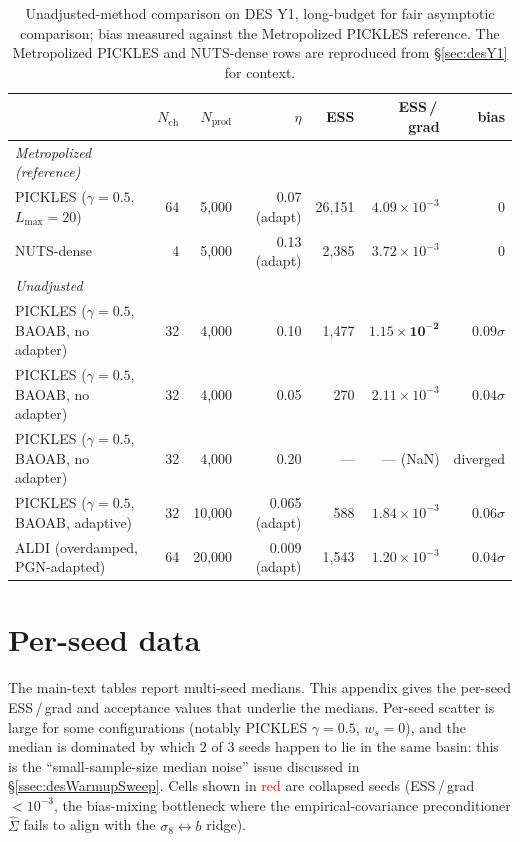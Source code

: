\documentclass{article}
\begin{document}
\begin{table}[t]
\centering
\caption{Unadjusted-method comparison on DES Y1, long-budget for fair
asymptotic comparison; bias measured against the Metropolized PICKLES
reference. The Metropolized PICKLES and NUTS-dense rows are reproduced
from \S\ref{sec:desY1} for context.}
\label{tab:desUnadjLongN}
\small
\begin{tabular}{l rrrr rr}
\toprule
& $N_{\text{ch}}$ & $N_{\text{prod}}$ & $\eta$ & ESS &
ESS\,/\,grad & bias \\
\midrule
\textit{Metropolized (reference)} & & & & & & \\
\quad PICKLES ($\gamma=0.5$, $L_{\max}=20$) & 64 & 5{,}000 & 0.07 (adapt) & 26{,}151 & $4.09\!\times\!10^{-3}$ & 0 \\
\quad NUTS-dense                              & 4  & 5{,}000 & 0.13 (adapt) & 2{,}385  & $3.72\!\times\!10^{-3}$ & 0 \\
\midrule
\textit{Unadjusted} & & & & & & \\
\quad PICKLES ($\gamma=0.5$, BAOAB, no adapter) & 32 & 4{,}000 & 0.10  & 1{,}477 & $\mathbf{1.15\!\times\!10^{-2}}$ & $0.09\sigma$ \\
\quad PICKLES ($\gamma=0.5$, BAOAB, no adapter) & 32 & 4{,}000 & 0.05  &     270 & $2.11\!\times\!10^{-3}$ & $0.04\sigma$ \\
\quad PICKLES ($\gamma=0.5$, BAOAB, no adapter) & 32 & 4{,}000 & 0.20  & --- & --- (NaN) & diverged \\
\quad PICKLES ($\gamma=0.5$, BAOAB, adaptive)   & 32 & 10{,}000 & 0.065 (adapt) &  588 & $1.84\!\times\!10^{-3}$ & $0.06\sigma$ \\
\quad ALDI (overdamped, PGN-adapted)            & 64 & 20{,}000 & 0.009 (adapt) & 1{,}543 & $1.20\!\times\!10^{-3}$ & $0.04\sigma$ \\
\bottomrule
\end{tabular}
\end{table}

\section{Per-seed data}\label{app:desPerSeed}

The main-text tables report multi-seed medians.  This appendix gives
the per-seed ESS\,/\,grad and acceptance values that underlie the
medians.  Per-seed scatter is large for some configurations (notably
PICKLES $\gamma=0.5$, $w_s=0$), and the median is dominated by which
$2$ of $3$ seeds happen to lie in the same basin: this is the
``small-sample-size median noise'' issue discussed in
\S\ref{ssec:desWarmupSweep}.  Cells shown in
\textcolor{red}{red} are collapsed seeds (ESS\,/\,grad
$<\!10^{-3}$, the bias-mixing bottleneck where the empirical-covariance
preconditioner $\hat\Sigma$ fails to align with the $\sigma_8\!\leftrightarrow\!b$
ridge).
\end{document}
